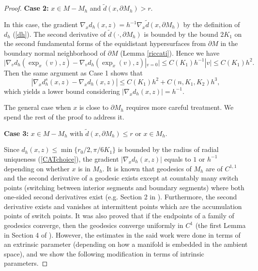 \documentclass[11pt,letterpaper]{amsart}
\numberwithin{equation}{section}
\theoremstyle{definition}
\theoremstyle{plain}
\theoremstyle{definition}
\theoremstyle{plain}
\theoremstyle{definition}
\theoremstyle{plain}
\begin{document}
\begin{proof}
\smallskip
\textbf{Case 2:}  $x\in M-M_h$ and $\widetilde{d}(x,\partial M_h)>r$.

In this case, the gradient $\nabla_x d_h(x,z)=h^{-1}\nabla_x \widetilde{d}(x,\partial M_h)$ by the definition of $d_h$ (\ref{dh}). The second derivative of $\widetilde{d}(\cdot,\partial M_h)$ is bounded by the bound $2K_1$ on the second fundamental forms of the equidistant hypersurfaces from $\partial M$ in the boundary normal neighborhood of $\partial M$ (Lemma \ref{riccati}). Hence we have
\begin{equation}\label{bdhcloseness-0}
\big|\nabla_v d_h(\exp_x(v),z)-\nabla_v d_h(\exp_x(v),z)|_{v=0}\big|\leqslant C(K_1)h^{-1}|v| \leqslant C(K_1) h^{2}.
\end{equation}
Then the same argument as Case 1 shows that
\begin{equation}\label{bdhcloseness}
|\nabla_x d_h^s(x,z)-\nabla_x d_h(x,z)|\leqslant C(K_1) h^{2}+C(n,K_1,K_2)h^3,
\end{equation}
which yields a lower bound considering $|\nabla_x d_h(x,z)|=h^{-1}$.

\medskip
The general case when $x$ is close to $\partial M_h$ requires more careful treatment. We spend the rest of the proof to address it.

\smallskip
\textbf{Case 3:} $x\in M-M_h$ with $\widetilde{d}(x,\partial M_h)\leqslant r$ or $x\in M_h$.

Since $d_h(x,z)\leqslant \min\{r_0/2,\pi/6K_1\}$ is bounded by the radius of radial uniqueness (\ref{CATchoice}), the gradient $|\nabla_x d_h(x,z)|$ equals to $1$ or $h^{-1}$ depending on whether $x$ is in $M_h$. It is known that geodesics of $M_h$ are of $C^{1,1}$ and the second derivative of a geodesic exists except at countably many switch points (switching between interior segments and boundary segments) where both one-sided second derivatives exist (e.g. Section 2 in \cite{ABB}). Furthermore, the second derivative exists and vanishes at intermittent points which are the accumulation points of switch points. It was also proved that if the endpoints of a family of geodesics converge, then the geodesics converge uniformly in $C^1$ (the first Lemma in Section 4 of \cite{ABB}). However, the estimates in the said work were done in terms of an extrinsic parameter (depending on how a manifold is embedded in the ambient space), and we show the following modification in terms of intrinsic parameters.


\end{proof}
\end{document}
